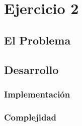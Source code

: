 \section{Ejercicio 2}
\subsection{El Problema}
\subsection{Desarrollo}
\subsubsection{Implementación}
\subsubsection{Complejidad}
